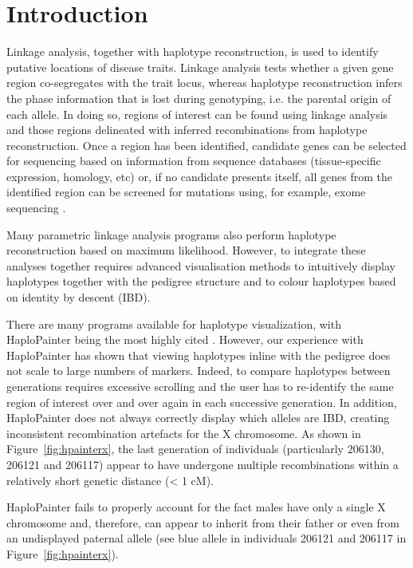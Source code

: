 \documentclass{bioinfo}
\numberwithin{equation}{section}
\def\hpainter{{HaploPainter}}
\begin{document}
\maketitle

\section{Introduction}

\enlargethispage{15pt}
Linkage analysis, together with haplotype reconstruction, is used to identify putative locations of disease traits. Linkage analysis tests whether a given gene region co-segregates with the trait locus, whereas haplotype reconstruction infers the phase information that is lost during genotyping, i.e. the parental origin of each allele. In doing so, regions of interest can be found using linkage analysis and those regions delineated with inferred recombinations from haplotype reconstruction. Once a region has been identified, candidate genes can be selected for sequencing based on information from sequence databases (tissue-specific expression, homology, etc) or, if no candidate presents itself, all genes from the identified region can be screened for mutations using, for example, exome sequencing \citep{bockenhauer2012genetic}.

Many parametric linkage analysis programs also perform haplotype reconstruction based on maximum likelihood. However, to integrate these analyses together requires advanced visualisation methods to intuitively display haplotypes together with the pedigree structure and to colour haplotypes based on identity by descent (IBD).


There are many programs available for haplotype visualization, with \hpainter{} being the most highly cited \citep{hpaint}. However, our experience with \hpainter{} has shown that viewing haplotypes inline with the pedigree does not scale to large numbers of markers. Indeed, to compare haplotypes between generations requires excessive scrolling and the user has to re-identify the same region of interest over and over again in each successive generation. In addition, \hpainter{} does not always correctly display which alleles are IBD, creating inconsistent recombination artefacts for the X chromosome. As shown in Figure~\ref{fig:hpainterx}, the last generation of individuals (particularly 206130, 206121 and 206117) appear to have undergone multiple recombinations within a relatively short genetic distance (< 1 cM).

\hpainter{} fails to properly account for the fact males have only a single X chromosome and, therefore, can appear to inherit from their father or even from an undisplayed paternal allele (see blue allele in individuals 206121 and 206117 in Figure~\ref{fig:hpainterx}).
\end{document}
